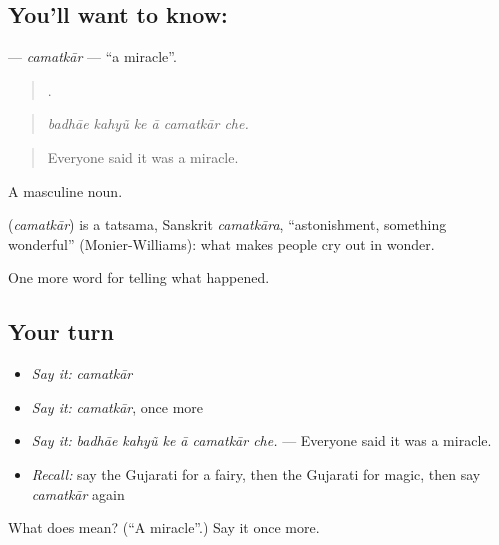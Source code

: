 \subsection*{You'll want to know: }
\textbf{} — \emph{camatkār} — \textquotedblleft{}a miracle\textquotedblright{}.

\begin{quote}
     .
\end{quote}

\begin{quote}
\emph{badhāe kahyũ ke ā camatkār che.}
\end{quote}

\begin{quote}
Everyone said it was a miracle.
\end{quote}

A masculine noun.

\begin{cousinweb}
\textbf{} (\emph{camatkār}) is a tatsama, Sanskrit \emph{camatkāra}, \textquotedblleft{}astonishment, something wonderful\textquotedblright{} (Monier-Williams): what makes people cry out in wonder.
\end{cousinweb}

\begin{grammarlens}[title={What you've built}]
One more word for telling what happened.
\end{grammarlens}

\subsection*{Your turn}
\begin{itemize}
\raggedright
  \item \emph{Say it:} \emph{camatkār}
  \item \emph{Say it:} \emph{camatkār}, once more
  \item \emph{Say it:} \emph{badhāe kahyũ ke ā camatkār che.} — Everyone said it was a miracle.
  \item \emph{Recall:} say the Gujarati for a fairy, then the Gujarati for magic, then say \emph{camatkār} again
\end{itemize}

\begin{tcolorbox}[breakable,colback=teal!4,colframe=teal!35!black,title={Before you move on}]
What does  mean? (\textquotedblleft{}A miracle\textquotedblright{}.) Say it once more.
\end{tcolorbox}
